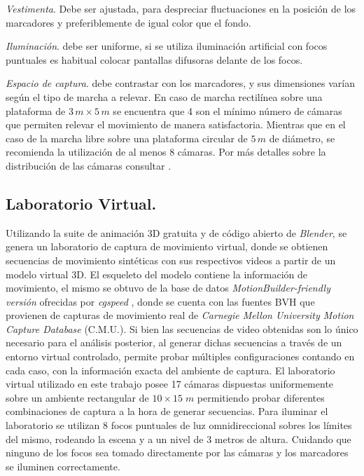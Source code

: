 \textit{Vestimenta}. Debe ser ajustada, para despreciar fluctuaciones en la posición de los marcadores y preferiblemente de igual color que el fondo. 


\textit{Iluminación}. debe ser uniforme, si se utiliza iluminación artificial con focos puntuales es habitual colocar pantallas difusoras delante de los focos.


\textit{Espacio de captura}. debe contrastar con los marcadores, y sus dimensiones varían según el tipo de marcha a relevar. En caso de marcha rectilínea sobre una plataforma de $3\,m \times 5 \,m$ se encuentra que 4 son el mínimo número de cámaras que permiten relevar el movimiento de manera satisfactoria. Mientras  que en el caso de la marcha libre sobre una plataforma circular de $5\,m$ de diámetro, se recomienda la utilización de al menos 8 cámaras. Por más detalles sobre la distribución de las cámaras consultar \cite{proyecto_biomecanica}. 

\vspace{-0.3cm} 
\subsection{Laboratorio Virtual.} Utilizando la suite de animación 3D gratuita y de código abierto de \textit{Blender}, se genera un laboratorio de captura de movimiento virtual, donde se obtienen secuencias de movimiento sintéticas con sus respectivos videos a partir de un modelo virtual 3D. El esqueleto del modelo contiene la información de movimiento, el mismo se obtuvo de la base de datos \textit{MotionBuilder-friendly versión} ofrecidas por \textit{cgspeed} \cite{cgspeed}, 
donde se cuenta con las fuentes BVH que provienen de capturas de movimiento real de \textit{Carnegie Mellon University Motion Capture Database} (C.M.U.). Si bien las secuencias de video obtenidas son lo único necesario para el análisis posterior, al generar dichas secuencias a través de un entorno virtual controlado, permite probar múltiples configuraciones contando en cada caso, con la información exacta del ambiente de captura. El laboratorio virtual utilizado en este trabajo posee 17 cámaras dispuestas uniformemente sobre un ambiente rectangular de $10\times15\;m $ permitiendo probar diferentes combinaciones de captura a la hora de generar secuencias. 
Para iluminar el laboratorio se utilizan $8$ focos puntuales de luz omnidireccional sobres los límites del mismo, rodeando la escena y a un nivel de 3 metros de altura. Cuidando que ninguno de los focos sea tomado directamente por las cámaras y los marcadores se iluminen correctamente.


